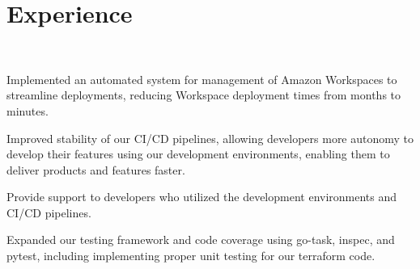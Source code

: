 \documentclass[letterpaper]{deedy-resume-openfont} %
\begin{document}
\begin{minipage}[t]{0.70\textwidth} %


\section{Experience}

\\

\vspace{\topsep} %
\begin{tightitemize}
\item Implemented an automated system for management of Amazon Workspaces to streamline deployments, reducing Workspace deployment times from months to minutes.
\item Improved stability of our CI/CD pipelines, allowing developers more autonomy to develop their features using our development environments, enabling them to deliver products and features faster.
\item Provide support to developers who utilized the development environments and CI/CD pipelines.
\item Expanded our testing framework and code coverage using go-task, inspec, and pytest, including implementing proper unit testing for our terraform code.
\end{tightitemize}

\sectionspace

 \\


\end{minipage}
\end{document}
